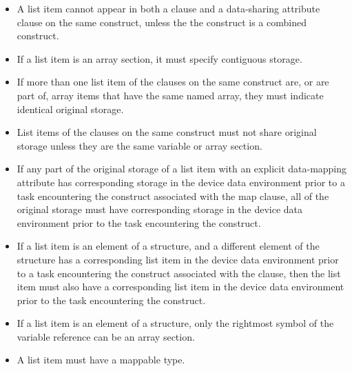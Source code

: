 \restrictions
\begin{itemize}

\item A list item cannot appear in both a  clause and a data-sharing
    attribute clause on the same construct, unless the the construct is a
    combined construct.


\item If a list item is an array section, it must specify contiguous storage.

\item If more than one list item of the  clauses on the same construct
are, or are part of, array items that have the same named array, they must indicate
identical original storage.

\item List items of the  clauses on the same construct must not share
original storage unless they are the same variable or array section.

\item If any part of the original storage of a list item with an
explicit data-mapping attribute has corresponding storage in the device data
environment prior to a task encountering the construct associated with the map
clause, all of the original storage must have corresponding storage
in the device data environment prior to the task encountering the construct.

\item If a list item is an element of a structure, and a different element
of the structure has a corresponding list item in the device data environment
prior to a task encountering the construct associated with the 
clause, then the list item must also have a corresponding list item in the
device data environment prior to the task encountering the construct.

\item If a list item is an element of a structure, only the rightmost symbol of the variable reference can be an array section.

\item A list item must have a mappable type.


\end{itemize}
